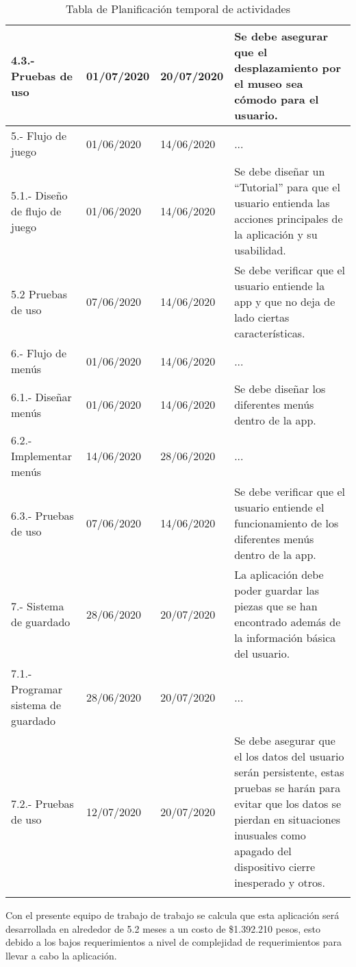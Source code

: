 \begin{longtable}{| p{}| p{}| p{}| p{}|}
\\
\hline 
	4.3.- Pruebas de uso &
	01/07/2020 &
	20/07/2020 &
	Se debe asegurar que el desplazamiento por el museo sea cómodo para el usuario.
\\
\hline 
	5.- Flujo de juego &
	01/06/2020 &
	14/06/2020 & 
	...
	\\
\hline 
	5.1.- Diseño de flujo de juego &
	01/06/2020 &
	14/06/2020 &
	Se debe diseñar un “Tutorial” para que el usuario entienda las acciones principales de la aplicación y su usabilidad.
\\
\hline 
	5.2 Pruebas de uso &
	07/06/2020 &
	14/06/2020 & 
	Se debe verificar que el usuario entiende la app y que no deja de lado ciertas características.
\\
\hline 
	6.- Flujo de menús &
	01/06/2020 &
	14/06/2020 &
	...
\\ 
\hline 
	6.1.- Diseñar menús &
	01/06/2020 &
	14/06/2020 &
	Se debe diseñar los diferentes menús dentro de la app.
\\
\hline 
	6.2.- Implementar menús &
	14/06/2020 &
	28/06/2020 &
	...
\\ 
\hline 
	6.3.- Pruebas de uso &
	07/06/2020 &
	14/06/2020 & 
	Se debe verificar que el usuario entiende el funcionamiento de los diferentes menús dentro de la app.
\\
\hline 
	7.- Sistema de guardado &
	28/06/2020 &
	20/07/2020 & 
	La aplicación debe poder guardar las piezas que se han encontrado además de la información básica del usuario.
\\ 
\hline 
	7.1.- Programar sistema de guardado &
	28/06/2020 &
	20/07/2020 & 
	...
\\ 
\hline 
	7.2.- Pruebas de uso &
	12/07/2020 &
	20/07/2020 &
	Se debe asegurar que el los datos del usuario serán persistente, estas pruebas se harán para evitar que los datos se pierdan en situaciones inusuales como apagado del dispositivo cierre inesperado y otros.
\\
\hline
\caption{Tabla de Planificación temporal de actividades}
\label{tab17}
\end{longtable} 

Con el presente equipo de trabajo de trabajo se calcula que esta aplicación será desarrollada en alrededor de 5.2 meses  a un costo de \$1.392.210 pesos, esto debido a los bajos requerimientos a nivel de complejidad de requerimientos para llevar a cabo la aplicación.


